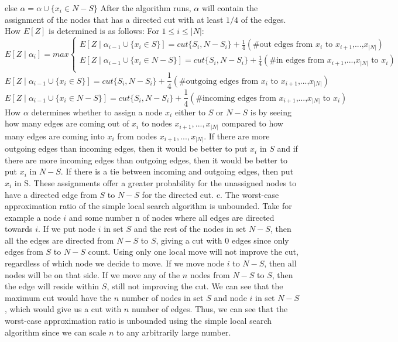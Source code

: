 \documentclass[oneside]{homework} %
\begin{document}
\quad \quad else $\alpha = \alpha \cup \{x_i \in N-S\}$ \newline
\newline
After the algorithm runs, $\alpha$ will contain the assignment of the nodes that has a directed cut with at least $1/4$ of the edges. How $E[Z]$ is determined is as follows: \newline
For $1 \leq i \leq |N|$:
\begin{equation*}
  E[Z \mid \alpha_i] = max
  \begin{cases}
    E[Z \mid \alpha_{i-1} \cup \{x_i \in S\}] = cut\{S_i, N-S_i\} + \frac{1}{4}(\#\text{out edges from $x_i$ to $x_{i+1}$,...,$x_{|N|}$}) \\
    E[Z \mid \alpha_{i-1} \cup \{x_i \in N-S\}] = cut\{S_i, N-S_i\} + \frac{1}{4}(\#\text{in edges from $x_{i+1}$,...,$x_{|N|}$ to $x_i$})\\
  \end{cases}
\end{equation*}
\newline
$$E[Z \mid \alpha_{i-1} \cup \{x_i \in S\}] = cut\{S_i, N-S_i\} + \frac{1}{4}(\#\text{outgoing edges from $x_i$ to $x_{i+1}$,...,$x_{|N|}$})$$
$$E[Z \mid \alpha_{i-1} \cup \{x_i \in N-S\}] = cut\{S_i, N-S_i\} + \frac{1}{4}(\#\text{incoming edges from $x_{i+1}$,...,$x_{|N|}$ to $x_i$})$$
How $\alpha$ determines whether to assign a node $x_i$ either to $S$ or $N-S$ is by seeing how many edges are coming out of $x_i$ to nodes $x_{i+1},...,x_{|N|}$ compared to how many edges are coming into $x_i$ from nodes $x_{i+1},...,x_{|N|}$. If there are more outgoing edges than incoming edges, then it would be better to put $x_i$ in $S$ and if there are more incoming edges than outgoing edges, then it would be better to put $x_i$ in $N-S$. If there is a tie between incoming and outgoing edges, then put $x_i$ in S. These assignments offer a greater probability for the unassigned nodes to have a directed edge from $S$ to $N-S$ for the directed cut. 
\newline
\newline
{\large c.} The worst-case approximation ratio of the simple local search algorithm is unbounded. Take for example a node $i$ and some number n of nodes where all edges are directed towards $i$. If we put node $i$ in set $S$ and the rest of the nodes in set $N-S$, then all the edges are directed from $N-S$ to $S$, giving a cut with 0 edges since only edges from $S$ to $N-S$ count. Using only one local move will not improve the cut, regardless of which node we decide to move. If we move node $i$ to $N-S$, then all nodes will be on that side. If we move any of the $n$ nodes from $N-S$ to $S$, then the edge will reside within $S$, still not improving the cut. We can see that the maximum cut would have the $n$ number of nodes in set $S$ and node $i$ in set $N-S$, which would give us a cut with $n$ number of edges. Thus, we can see that the worst-case approximation ratio is unbounded using the simple local search algorithm since we can scale $n$ to any arbitrarily large number.
\end{document}

